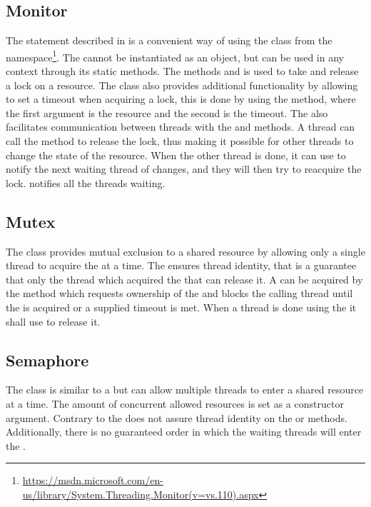 \subsection{Monitor}
The  statement described in  is a convenient way of using the  class from the  namespace\footnote{\url{https://msdn.microsoft.com/en-us/library/System.Threading.Monitor(v=vs.110).aspx}}. The  cannot be instantiated as an object, but can be used in any context through its static methods. The methods  and  is used to take and release a lock on a resource. The  class also provides additional functionality by allowing to set a timeout when acquiring a lock, this is done by using the  method, where the first argument is the resource and the second is the timeout. The  also facilitates communication between threads with the   and  methods. A thread can call the  method to release the lock, thus making it possible for other threads to change the state of the resource. When the other thread is done, it can use  to notify the next waiting thread of changes, and they will then try to reacquire the lock.  notifies all the threads waiting.
\subsection{Mutex}
The  class provides mutual exclusion to a shared resource by allowing only a single thread to acquire the  at a time. The  ensures thread identity, that is a guarantee that only the thread which acquired the  that can release it. A  can be acquired by the method  which requests ownership of the  and blocks the calling thread until the  is acquired or a supplied timeout is met. When a thread is done using the  it shall use  to release it.

\subsection{Semaphore}
The  class is similar to a  but can allow multiple threads to enter a shared resource at a time. The amount of concurrent allowed resources is set as a constructor argument. Contrary to  the  does not assure thread identity on the  or  methods. Additionally, there is no guaranteed order in which the waiting threads will enter the . 

